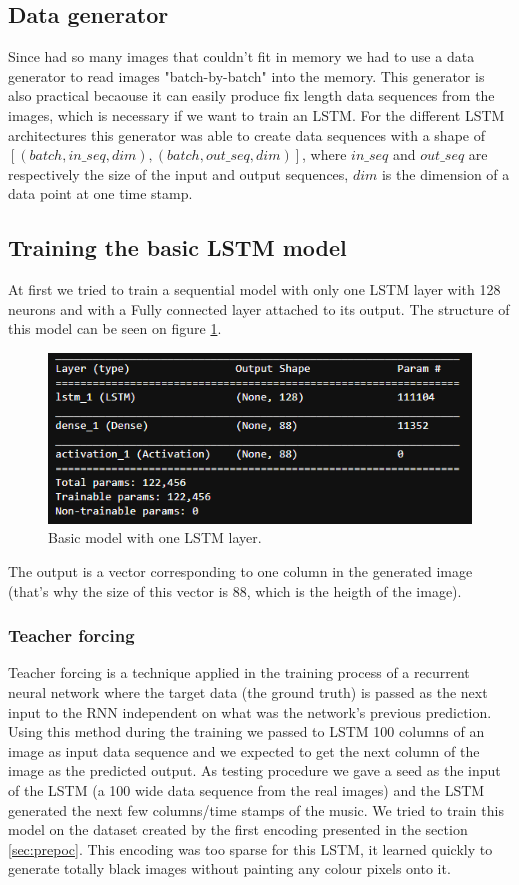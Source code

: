\documentclass{article}
\begin{document}
\subsection{Data generator}

Since had so many images that couldn't fit in memory we had to use a data generator to read images "batch-by-batch" into the memory. This generator is also practical becaouse it can easily produce fix length data sequences from the images, which is necessary if we want to train an LSTM. For the different LSTM architectures this generator was able to create data sequences with a shape of $[(batch, in\_seq, dim), (batch, out\_seq, dim)]$, where $in\_seq$ and $out\_seq$ are respectively the size of the input and output sequences, $dim$ is the dimension of a data point at one time stamp.  

\subsection{Training the basic LSTM model}

At first we tried to train a sequential model with only one LSTM layer with 128 neurons and with a Fully connected layer attached to its output. The structure of this model can be seen on figure \ref{fig:basicLSTMmodel}. 
\begin{figure}[!htb]
	\centering
	\includegraphics[width=0.7\linewidth]{basicLSTMmodel.png}
	\caption{Basic model with one LSTM layer.}
	\label{fig:basicLSTMmodel}
\end{figure}

The output is a vector corresponding to one column in the generated image (that's why the size of this vector is 88, which is the heigth of the image). 

\subsubsection{Teacher forcing}
Teacher forcing is a technique applied in the training process of a recurrent neural network where the target data (the ground truth) is passed as the next input to the RNN independent on what was the network's previous prediction. 
Using this method during the training we passed to LSTM 100 columns of an image as input data sequence and we expected to get the next column of the image as the predicted output. 
As testing procedure we gave a seed as the input of the LSTM (a 100 wide data sequence from the real images) and the LSTM generated the next few columns/time stamps of the music.
We tried to train this model on the dataset created by the first encoding presented in the section \ref{sec:prepoc}. This encoding was too sparse for this LSTM, it learned quickly to generate totally black images without painting any colour pixels onto it. 
\end{document}

